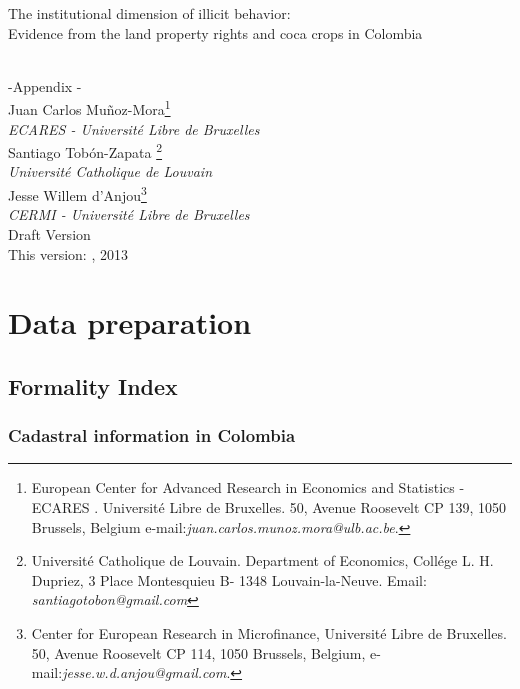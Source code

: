 \documentclass[11pt]{amsart}
\begin{document}
\begin{center}
  \begin{huge}  The institutional dimension of illicit behavior:  \\[0.5cm] Evidence from the land property rights and  coca
crops in Colombia  \end{huge}\\[2cm]   -Appendix - \\[4cm]

{\large Juan Carlos Mu\~noz-Mora\footnote{European Center for Advanced Research in Economics and Statistics -ECARES . Universit\'e Libre de Bruxelles. 50, Avenue Roosevelt CP 139, 1050 Brussels, Belgium  e-mail:\textit{juan.carlos.munoz.mora@ulb.ac.be}.}  \\ \normalsize \textit{ECARES - Universit\'e Libre de Bruxelles}}\\[0.5cm]

{\large Santiago Tob\'on-Zapata \footnote{ Universit\'e Catholique de Louvain. Department of Economics, Coll\'ege L. H. Dupriez, 3 Place Montesquieu B- 1348 Louvain-la-Neuve. Email: \textit{santiagotobon@gmail.com}} \\ \normalsize \textit{Universit\'e Catholique de Louvain}}\\[0.5cm]

{\large Jesse Willem d'Anjou\footnote{Center for European Research in Microfinance, Universit\'e Libre de Bruxelles. 50, Avenue Roosevelt CP 114, 1050 Brussels, Belgium, e-mail:\textit{jesse.w.d.anjou@gmail.com}.}  \\ \normalsize \textit{CERMI - Universit\'e Libre de Bruxelles}}\\[1.5cm]
{\large Draft Version }\\
\large This version: \monthname , 2013
\end{center}
\pagebreak
\tableofcontents
\pagebreak



\section{Data preparation}

\subsection{Formality Index}

\subsubsection{Cadastral information in Colombia}
\end{document}
